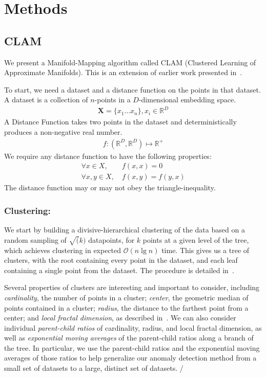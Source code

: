 \section{Methods}
\label{sec:methods}

\subsection{CLAM}
\label{subsec:methods:clam}

We present a Manifold-Mapping algorithm called CLAM (Clustered Learning of Approximate Manifolds).
This is an extension of earlier work presented in~\cite{ishaq2019clustered}.

To start, we need a dataset and a distance function on the points in that dataset.
A dataset is a collection of $n$-points in a $D$-dimensional embedding space.
\begin{gather*}
    \textbf{X} = \{x_1 \dots x_n\}, x_i \in \mathbb{R}^D
\end{gather*}
A Distance Function takes two points in the dataset and deterministically produces a non-negative real number.
\begin{gather*}
    f : (\mathbb{R}^D, \mathbb{R}^D) \mapsto \mathbb{R}^+
\end{gather*}
We require any distance function to have the following properties:
\begin{align*}
    \forall x \in X,    & \ f(x, x) = 0       \\
    \forall x, y \in X, & \ f(x, y) = f(y, x)
\end{align*}
The distance function may or may not obey the triangle-inequality.

\subsubsection{Clustering:}\label{subsubsec:methods:clam:clustering}
We start by building a divisive-hierarchical clustering of the data based on a random sampling of $\sqrt(k)$ datapoints, for $k$ points at a given level of the tree, which achieves clustering in expected $\mathcal{O}(n \lg n)$ time.
This gives us a tree of clusters, with the root containing every point in the dataset, and each leaf containing a single point from the dataset.
The procedure is detailed in~\cite{ishaq2019clustered}.

Several properties of clusters are interesting and important to consider, including \textit{cardinality}, the number of points in a cluster; \textit{center}, the geometric median of points contained in a cluster; \textit{radius}, the distance to the farthest point from a center; and \textit{local fractal dimension}, as described in~\cite{ishaq2019clustered}.
We can also consider individual \textit{parent-child ratios} of cardinality, radius, and local fractal dimension, as well as \textit{exponential moving averages} of the parent-child ratios along a branch of the tree.
In particular, we use the parent-child ratios and the exponential moving averages of those ratios to help generalize our anomaly detection method from a small set of datasets to a large, distinct set of datasets.
/
